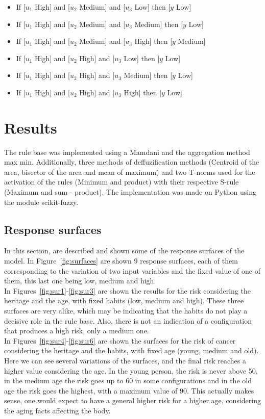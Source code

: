 \documentclass[conference]{IEEEtran}
\begin{document}
\begin{itemize}
\item If [$u_1$ High] and [$u_2$ Medium] and [$u_3$ Low] then [$y$ Low]
\item If [$u_1$ High] and [$u_2$ Medium] and [$u_3$ Medium] then [$y$ Low]
\item If [$u_1$ High] and [$u_2$ Medium] and [$u_3$ High] then [$y$ Medium]
\item If [$u_1$ High] and [$u_2$ High] and [$u_3$ Low] then [$y$ Low]
\item If [$u_1$ High] and [$u_2$ High] and [$u_3$ Medium] then [$y$ Low]
\item If [$u_1$ High] and [$u_2$ High] and [$u_3$ High] then [$y$ Low]
\end{itemize}

\section{Results}
The rule base was implemented using a Mamdani and the aggregation method max min. Additionally, three methods of deffuzification methods (Centroid of the area, bisector of the area and mean of maximum) and two T-norms used for the activation of the rules (Minimum and product) with their respective S-rule (Maximum and sum - product). The implementation was made on Python using the module scikit-fuzzy. \\

\subsection{Response surfaces}
In this section, are described and shown some of the response surfaces of the model. In Figure~\ref{fig:surfaces} are shown 9 response surfaces, each of them corresponding to the variation of two input variables and the fixed value of one of them, this last one being low, medium and high. \\

In Figures~\ref{fig:sur1}-\ref{fig:sur3} are shown the results for the risk considering the heritage and the age, with fixed habits (low, medium and high). These three surfaces are very alike, which may be indicating that the habits do not play a decisive role in the rule base. Also, there is not an indication of a configuration that produces a high risk, only a medium one.\\ 

In Figures~\ref{fig:sur4}-\ref{fig:sur6} are shown the surfaces for the risk of cancer considering the heritage and the habits, with fixed age (young, medium and old). Here we can see several variations of the surfaces, and the final risk reaches a higher value considering the age. In the young person, the risk is never above 50, in the medium age the risk goes up to 60 in some configurations and in the old age the risk goes the highest, with a maximum value of 90. This actually makes sense, one would expect to have a general higher risk for a higher age, considering the aging facts affecting the body. \\
\end{document}
